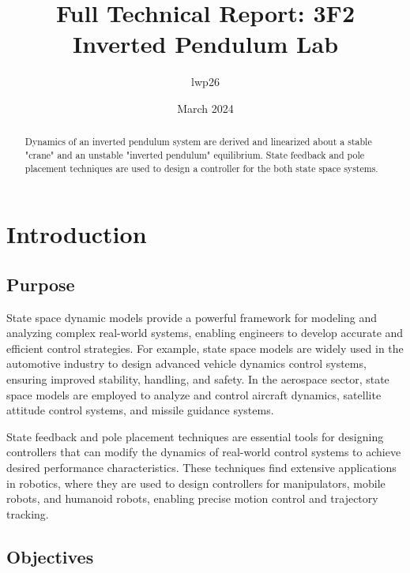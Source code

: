 \documentclass{article}
\begin{document}
\title{Full Technical Report: 3F2 Inverted Pendulum Lab}
\author{lwp26}
\date{March 2024}
\maketitle 

\begin{abstract}
    \centering
    Dynamics of an inverted pendulum system are derived and linearized about a stable "crane" and an unstable "inverted pendulum" equilibrium. State feedback and pole placement techniques are used to design a controller for the both state space systems.
\end{abstract}

\section{Introduction}

\subsection{Purpose}

State space dynamic models provide a powerful framework for modeling and analyzing complex real-world systems, enabling engineers to develop accurate and efficient control strategies. For example, state space models are widely used in the automotive industry to design advanced vehicle dynamics control systems, ensuring improved stability, handling, and safety. In the aerospace sector, state space models are employed to analyze and control aircraft dynamics, satellite attitude control systems, and missile guidance systems.

State feedback and pole placement techniques are essential tools for designing controllers that can modify the dynamics of real-world control systems to achieve desired performance characteristics. These techniques find extensive applications in robotics, where they are used to design controllers for manipulators, mobile robots, and humanoid robots, enabling precise motion control and trajectory tracking.

\subsection{Objectives}
\end{document}
